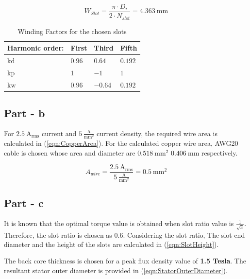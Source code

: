 \documentclass{article}
\begin{document}
\begin{equation} \label{eqn:SlotWidth}
    W_{Slot} = \frac{\pi \cdot D_i}{2 \cdot N_{slot}} =  4.363 \: \mathrm{mm}
\end{equation}
\begin{table}[h!] 
\begin{center}
\caption{Winding Factors for the chosen slots}
\label{table:WindingFactor}
\begin{tabular}{ |p{3cm}||p{3cm}|p{3cm}|p{3cm}|  }
 \hline
  Harmonic order: & First	& Third &Fifth\\
 \hline
 kd	& $0.96$	&	$0.64$ & $0.192$\\
 \hline
 kp &	$1$	& $-1$	&$1$\\
 \hline
 kw &$0.96$	& $-0.64$&	$0.192$\\
  \hline
 \end{tabular}
 \end{center}
 \end{table}

 \subsection{Part - b}
 For $2.5 \: \mathrm{A_{rms}}$ current and $5 \: \mathrm{\frac{A}{mm^2}}$ current density, the required wire area is calculated in (\ref{eqn:CopperArea}). For the calculated copper wire area, AWG20 cable is chosen whose area and diameter are $0.518 \: \mathrm{mm^2}$ $0.406 \: \mathrm{mm}$ respectively.

\begin{equation} \label{eqn:CopperArea}
    A_{wire} = \frac{2.5 \: \mathrm{A_{rms}}}{5 \: \mathrm{\frac{A}{mm^2}}} =  0.5 \: \mathrm{mm^2}
\end{equation}

\subsection{Part - c}
It is known that the optimal torque value is obtained when slot ratio value is $\frac{1}{\sqrt{3}}$. Therefore, the slot ratio is chosen as $0.6$. Considering the slot ratio, The slot-end diameter and the height of the slots are calculated in (\ref{eqn:SlotHeight}). 

The back core thickness is chosen for a peak flux density value of \textbf{1.5 Tesla}. The resultant stator outer diameter is provided in (\ref{eqn:StatorOuterDiameter}).
\end{document}
